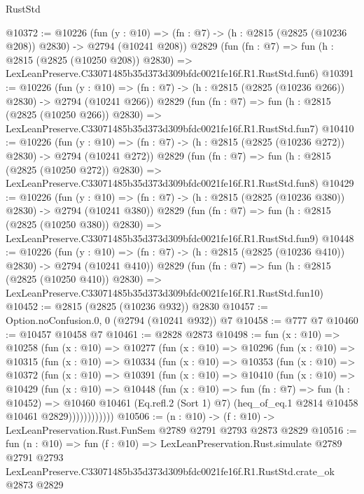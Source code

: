 \begin{lexlean}{RustStd}
\begin{coremodule}
@10372 := @10226
    (fun (y : @10) => (fn : @7) -> (h : @2815 (@2825 (@10236 @208)) @2830) -> @2794 (@10241 @208))
    @2829
    (fun (fn : @7) =>
    fun (h : @2815 (@2825 (@10250 @208)) @2830) =>
    LexLeanPreserve.C33071485b35d373d309bfdc0021fe16f.R1.RustStd.fun6)
@10391 := @10226
    (fun (y : @10) => (fn : @7) -> (h : @2815 (@2825 (@10236 @266)) @2830) -> @2794 (@10241 @266))
    @2829
    (fun (fn : @7) =>
    fun (h : @2815 (@2825 (@10250 @266)) @2830) =>
    LexLeanPreserve.C33071485b35d373d309bfdc0021fe16f.R1.RustStd.fun7)
@10410 := @10226
    (fun (y : @10) => (fn : @7) -> (h : @2815 (@2825 (@10236 @272)) @2830) -> @2794 (@10241 @272))
    @2829
    (fun (fn : @7) =>
    fun (h : @2815 (@2825 (@10250 @272)) @2830) =>
    LexLeanPreserve.C33071485b35d373d309bfdc0021fe16f.R1.RustStd.fun8)
@10429 := @10226
    (fun (y : @10) => (fn : @7) -> (h : @2815 (@2825 (@10236 @380)) @2830) -> @2794 (@10241 @380))
    @2829
    (fun (fn : @7) =>
    fun (h : @2815 (@2825 (@10250 @380)) @2830) =>
    LexLeanPreserve.C33071485b35d373d309bfdc0021fe16f.R1.RustStd.fun9)
@10448 := @10226
    (fun (y : @10) => (fn : @7) -> (h : @2815 (@2825 (@10236 @410)) @2830) -> @2794 (@10241 @410))
    @2829
    (fun (fn : @7) =>
    fun (h : @2815 (@2825 (@10250 @410)) @2830) =>
    LexLeanPreserve.C33071485b35d373d309bfdc0021fe16f.R1.RustStd.fun10)
@10452 := @2815 (@2825 (@10236 @932)) @2830
@10457 := Option.noConfusion.{0, 0} (@2794 (@10241 @932)) @7
@10458 := @777 @7
@10460 := @10457 @10458 @7
@10461 := @2828 @2873
@10498 := fun (x : @10) =>
  @10258
    (fun (x : @10) =>
    @10277
      (fun (x : @10) =>
      @10296
        (fun (x : @10) =>
        @10315
          (fun (x : @10) =>
          @10334
            (fun (x : @10) =>
            @10353
              (fun (x : @10) =>
              @10372
                (fun (x : @10) =>
                @10391
                  (fun (x : @10) =>
                  @10410
                    (fun (x : @10) =>
                    @10429
                      (fun (x : @10) =>
                      @10448
                        (fun (x : @10) =>
                        fun (fn : @7) =>
                        fun (h : @10452) =>
                        @10460
                          @10461
                          (Eq.refl.{2} (Sort 1) @7)
                          (heq_of_eq.{1} @2814 @10458 @10461 @2829))))))))))))
@10506 := (n : @10) -> (f : @10) -> LexLeanPreservation.Rust.FunSem @2789 @2791 @2793 @2873 @2829
@10516 := fun (n : @10) =>
  fun (f : @10) =>
  LexLeanPreservation.Rust.simulate
    @2789
    @2791
    @2793
    LexLeanPreserve.C33071485b35d373d309bfdc0021fe16f.R1.RustStd.crate_ok
    @2873
    @2829
\end{coremodule}
\end{lexlean}
